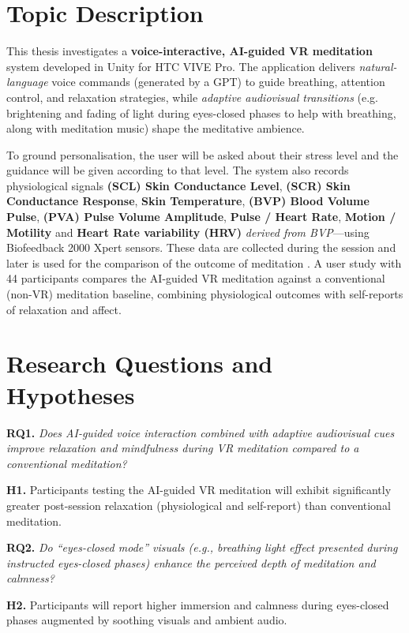 \section{Topic Description}
This thesis investigates a \textbf{voice-interactive, AI-guided VR meditation} system developed in Unity for HTC VIVE Pro. The application delivers \emph{natural-language} voice commands (generated by a GPT) to guide breathing, attention control, and relaxation strategies, while \emph{adaptive audiovisual transitions} (e.g. brightening and fading of light during eyes-closed phases to help with breathing, along with meditation music) shape the meditative ambience.

To ground personalisation, the user will be asked about their stress level and the guidance will be given according to that level. The system also records physiological signals \textbf{(SCL) Skin Conductance Level}, \textbf{(SCR) Skin Conductance Response}, \textbf{Skin Temperature}, \textbf{(BVP) Blood Volume Pulse}, \textbf{(PVA) Pulse Volume Amplitude}, \textbf{Pulse / Heart Rate}, \textbf{Motion / Motility} and \textbf{Heart Rate variability (HRV)} \textit{derived from BVP}—using Biofeedback 2000 Xpert sensors. These data are collected during the session and later is used for the comparison of the outcome of meditation \cite{lehrer2013hrv,chittaro2018placebo}. A user study with 44 participants compares the AI-guided VR meditation against a conventional (non-VR) meditation baseline, combining physiological outcomes with self-reports of relaxation and affect.

\section{Research Questions and Hypotheses}
\textbf{RQ1.} \emph{Does AI-guided voice interaction combined with adaptive audiovisual cues improve relaxation and mindfulness during VR meditation compared to a conventional meditation?}  

\textbf{H1.} Participants testing the AI-guided VR meditation will exhibit significantly greater post-session relaxation (physiological and self-report) than conventional meditation. 

\textbf{RQ2.} \emph{Do “eyes-closed mode” visuals (e.g., breathing light effect presented during instructed eyes-closed phases) enhance the perceived depth of meditation and calmness?}  

\textbf{H2.} Participants will report higher immersion and calmness during eyes-closed phases augmented by soothing visuals and ambient audio.

